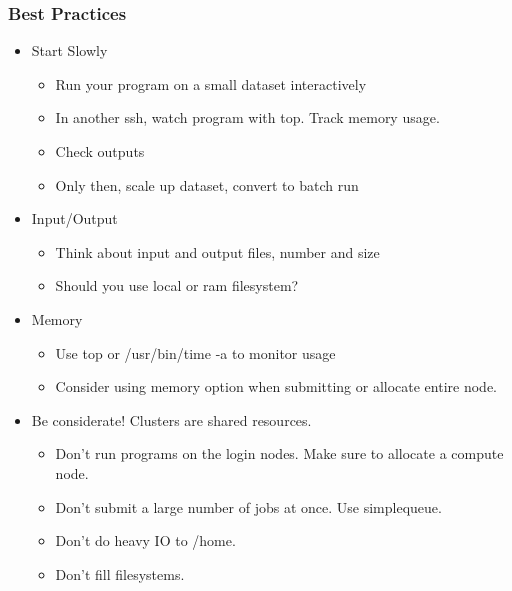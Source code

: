 \documentclass[10pt]{beamer}
\begin{document}
\begin{frame}[fragile]
\frametitle{Best Practices}

\begin{itemize}
\item Start Slowly
\begin{itemize}
\item Run your program on a small dataset interactively
\item In another ssh, watch program with top.  Track memory usage.
\item Check outputs
\item Only then, scale up dataset, convert to batch run
\end{itemize}
\item Input/Output
\begin{itemize}
\item Think about input and output files, number and size
\item Should you use local or ram filesystem? 
\end{itemize}
\item Memory

\begin{itemize}
\item Use top or /usr/bin/time -a to monitor usage
\item Consider using memory option when submitting or allocate entire node.
\end{itemize}

\item Be considerate!  Clusters are shared resources.

\begin{itemize}
\item Don't run programs on the login nodes.  Make sure to allocate a compute node.
\item Don't submit a large number of jobs at once.  Use simplequeue.
\item Don't do heavy IO to /home.
\item Don't fill filesystems.
\end{itemize}
\end{itemize}

\end{frame}
\end{document}
